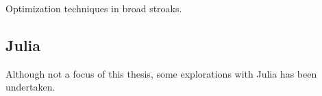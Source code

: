 Optimization techniques in broad stroaks.


\subsection{Julia}\label{subsec:res:julia}


Although not a focus of this thesis, some explorations with Julia has been undertaken.


%
%
%

